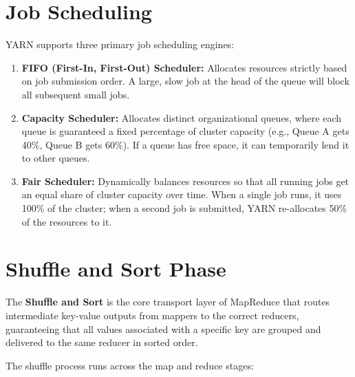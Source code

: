 \documentclass[12pt,a4paper]{article}
\begin{document}
\section{Job Scheduling}

YARN supports three primary job scheduling engines:

\begin{enumerate}[leftmargin=*, itemsep=4pt]
  \item \textbf{FIFO (First-In, First-Out) Scheduler:} Allocates resources strictly based on job submission order. A large, slow job at the head of the queue will block all subsequent small jobs.
  \item \textbf{Capacity Scheduler:} Allocates distinct organizational queues, where each queue is guaranteed a fixed percentage of cluster capacity (e.g., Queue A gets 40\%, Queue B gets 60\%). If a queue has free space, it can temporarily lend it to other queues.
  \item \textbf{Fair Scheduler:} Dynamically balances resources so that all running jobs get an equal share of cluster capacity over time. When a single job runs, it uses 100\% of the cluster; when a second job is submitted, YARN re-allocates 50\% of the resources to it.
\end{enumerate}

\section{Shuffle and Sort Phase}

\begin{tcolorbox}[defbox, title={The Shuffle and Sort}]
  The \textbf{Shuffle and Sort} is the core transport layer of MapReduce that routes intermediate key-value outputs from mappers to the correct reducers, guaranteeing that all values associated with a specific key are grouped and delivered to the same reducer in sorted order.
\end{tcolorbox}

The shuffle process runs across the map and reduce stages:
\end{document}

